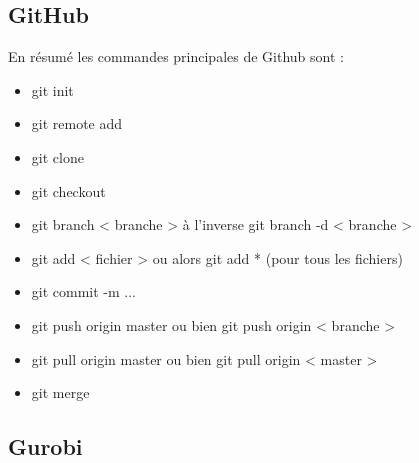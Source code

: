 \documentclass[a4paper, 12pt, twoside]{article}
\begin{document}
\subsection{GitHub}
En résumé les commandes principales de Github sont : 
\begin{itemize}
\item  git init 
\item git remote add 
\item  git clone 
\item  git checkout 
\item git branch < branche > à l'inverse  git branch -d < branche > 
\item git add < fichier > ou alors  git add * (pour tous les fichiers) 
\item  git commit -m ... 
\item  git push origin master ou bien  git push origin < branche > 
\item  git pull origin master   ou bien git pull origin < master > 
\item  git merge 
\end{itemize}
\subsection{Gurobi}
\newpage
\listoffigures
\end{document}
